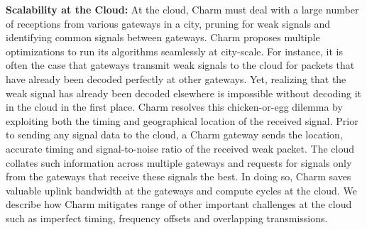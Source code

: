 \noindent \textbf{Scalability at the Cloud:} At the cloud, Charm must deal
with a large number of receptions from various gateways in a city, pruning for
weak signals and identifying common signals between gateways. Charm proposes
multiple optimizations to run its algorithms seamlessly at city-scale. For
instance, it is often the case that gateways transmit weak signals to the
cloud for packets that have already been decoded perfectly at other gateways.
Yet, realizing that the weak signal has already been decoded elsewhere is
impossible without decoding it in the cloud in the first place. Charm resolves
this chicken-or-egg dilemma by exploiting both the timing and geographical
location of the received signal. Prior to sending any signal data to the
cloud, a Charm gateway sends the location, accurate timing and signal-to-noise
ratio of the received weak packet. The cloud collates such information across
multiple gateways and requests for signals only from the gateways that receive
these signals the best. In doing so, Charm saves valuable uplink bandwidth at
the gateways and compute cycles at the cloud. We describe how Charm mitigates
range of other important challenges at the cloud such as imperfect timing,
frequency offsets and overlapping transmissions.






